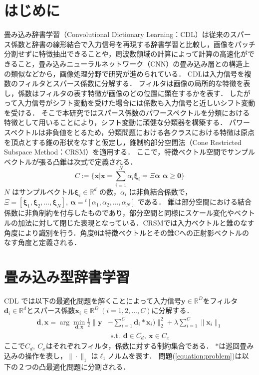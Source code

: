 \documentclass[9pt,a4paper,twocolumn,uplatex]{jsarticle}
\begin{document}
\section{はじめに}
畳み込み辞書学習（Convolutional Dictionary Learning：CDL）は従来のスパース係数と辞書の線形結合で入力信号を再現する辞書学習と比較し，画像をパッチ分割せずに特徴抽出できることや，周波数領域の計算によって計算の高速化ができること，畳み込みニューラルネットワーク（CNN）の畳み込み層との構造上の類似などから，画像処理分野で研究が進められている\cite{csc}．
CDLは入力信号を複数のフィルタとスパース係数に分解する．
フィルタは画像の局所的な特徴を表し，係数はフィルタの表す特徴が画像のどの位置に顕在するかを表す．
したがって入力信号がシフト変動を受けた場合には係数も入力信号と近しいシフト変動を受ける．
そこで本研究ではスパース係数のパワースペクトルを分類における特徴として用いることにより，シフト変動に頑健な分類器を構築する．
パワースペクトルは非負値をとるため，分類問題における各クラスにおける特徴は原点を頂点とする錐の形状をなすと仮定し，錐制約部分空間法（Cone  Restricted Subspace Method：CRSM）\cite{subspace}を適用する．
ここで，特徴ベクトル空間でサンプルベクトルが張る凸錐は次式で定義される．
\begin{equation}
C:=\{\bm x|\bm x=\sum_{i=1}^{N}\alpha_i\bm\xi_i=\Xi\bm\alpha\,~\bm\alpha\geq\bm 0\}
\end{equation}
$N$ はサンプルベクトル$\bm\xi_i\in\mathbb R^d$ の数，$\alpha_i$ は非負結合係数で，$\Xi=[\bm\xi_1,\bm\xi_2,...,\bm\xi_N],~\bm\alpha={}^t[\alpha_1,\alpha_2,...,\alpha_N]$ である．
錐は部分空間における結合係数に非負制約を付与したものであり，部分空間と同様にスケール変化やベクトルの加法に対して閉じた表現となっている．CRSMでは入力ベクトルと錐のなす角度により識別を行う．角度θは特徴ベクトルとその錐Cへの正射影ベクトルのなす角度と定義される．

\section{畳み込み型辞書学習}
CDL では以下の最適化問題を解くことによって入力信号$\bm y\in\mathbb R^D$をフィルタ$\bm d_i\in\mathbb R^d$とスパース係数$\bm x_i\in\mathbb R^D~(i=1,2,...,C)$に分解する．
\begin{eqnarray}
\label{equation:problem}
\bm d, \bm x=\arg\min_{\bm d, \bm x}\frac{1}{2}\|\bm y&-\sum_{i=1}^{C}\bm d_i*\bm x_i)\|_2^2+\lambda\sum_{i=1}^{C}\|\bm x_i\|_1\nonumber\\
&~~\text{s.t.}~~\bm d\in C_d,~\bm x\in C_x
\end{eqnarray}
ここで$C_d,~C_x$はそれぞれフィルタ，係数に対する制約集合である．
$*$は巡回畳み込みの操作を表し，$\|\cdot\|_1$ は$\ell_1$ノルムを表す．
問題(\ref{equation:problem})は以下の２つの凸最適化問題に分割される．
\end{document}
